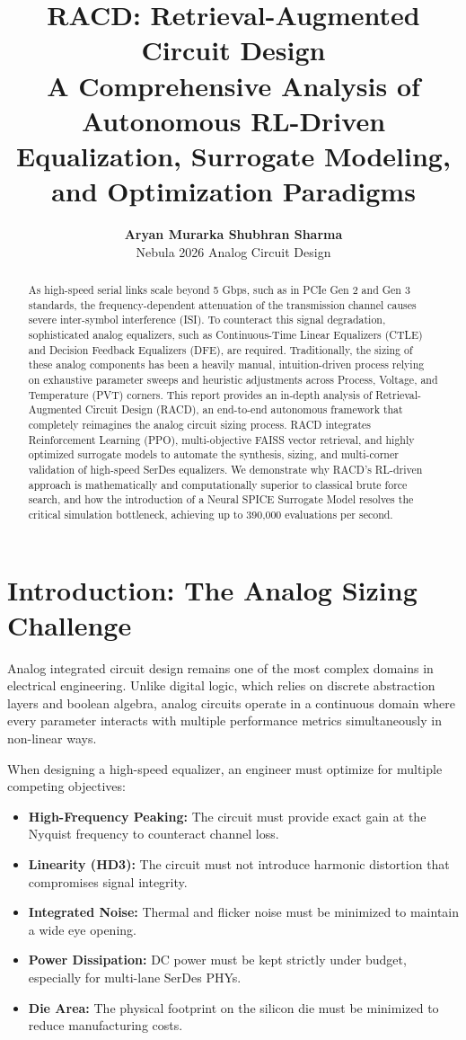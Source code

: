 \documentclass[11pt, a4paper]{article}
\title{\textbf{RACD: Retrieval-Augmented Circuit Design}\\
\vspace{0.5em}
\Large A Comprehensive Analysis of Autonomous RL-Driven Equalization, Surrogate Modeling, and Optimization Paradigms}
\author{
  \textbf{Aryan Murarka \quad Shubhran Sharma} \\
  \vspace{0.3em}
  Nebula 2026 Analog Circuit Design
}
\date{}
\begin{document}
\maketitle

\begin{abstract}
As high-speed serial links scale beyond 5 Gbps, such as in PCIe Gen 2 and Gen 3 standards, the frequency-dependent attenuation of the transmission channel causes severe inter-symbol interference (ISI). To counteract this signal degradation, sophisticated analog equalizers, such as Continuous-Time Linear Equalizers (CTLE) and Decision Feedback Equalizers (DFE), are required. Traditionally, the sizing of these analog components has been a heavily manual, intuition-driven process relying on exhaustive parameter sweeps and heuristic adjustments across Process, Voltage, and Temperature (PVT) corners. This report provides an in-depth analysis of Retrieval-Augmented Circuit Design (RACD), an end-to-end autonomous framework that completely reimagines the analog circuit sizing process. RACD integrates Reinforcement Learning (PPO), multi-objective FAISS vector retrieval, and highly optimized surrogate models to automate the synthesis, sizing, and multi-corner validation of high-speed SerDes equalizers. We demonstrate why RACD's RL-driven approach is mathematically and computationally superior to classical brute force search, and how the introduction of a Neural SPICE Surrogate Model resolves the critical simulation bottleneck, achieving up to 390,000 evaluations per second.
\end{abstract}

\newpage
\tableofcontents
\newpage

\section{Introduction: The Analog Sizing Challenge}
Analog integrated circuit design remains one of the most complex domains in electrical engineering. Unlike digital logic, which relies on discrete abstraction layers and boolean algebra, analog circuits operate in a continuous domain where every parameter interacts with multiple performance metrics simultaneously in non-linear ways.

When designing a high-speed equalizer, an engineer must optimize for multiple competing objectives:
\begin{itemize}
    \item \textbf{High-Frequency Peaking:} The circuit must provide exact gain at the Nyquist frequency to counteract channel loss.
    \item \textbf{Linearity (HD3):} The circuit must not introduce harmonic distortion that compromises signal integrity.
    \item \textbf{Integrated Noise:} Thermal and flicker noise must be minimized to maintain a wide eye opening.
    \item \textbf{Power Dissipation:} DC power must be kept strictly under budget, especially for multi-lane SerDes PHYs.
    \item \textbf{Die Area:} The physical footprint on the silicon die must be minimized to reduce manufacturing costs.
\end{itemize}
\end{document}
